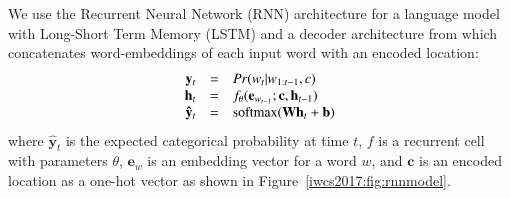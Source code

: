 We use the Recurrent Neural Network (RNN) architecture
for a language model \cite{graves2013generating} with Long-Short Term Memory
(LSTM) \cite{hochreiter1997long} and a decoder architecture from
\cite{cho2014learning} which concatenates word-embeddings of each input word with an encoded location:
\begin{equation}
\begin{array}{r c l}
  \mathbf{y}_t &=& Pr(w_t| w_{1:t-1},c)  \\
  \mathbf{h}_t &=& f_{\theta}(\mathbf{e}_{w_{t-1}};\mathbf{c}, \mathbf{h}_{t-1}) \\
  \mathbf{\hat{y}}_t &=& \mathrm{softmax}(\mathbf{W} \mathbf{h}_t+\mathbf{b})
\end{array}
\end{equation}
\noindent where $\mathbf{\hat{y}}_t$ is the expected categorical probability
at time $t$, $f$ is a recurrent cell with parameters $\theta$,
$\mathbf{e}_w$ is an embedding vector for a word $w$, and $\mathbf{c}$ is an
encoded location as a one-hot vector as shown in Figure~\ref{iwcs2017:fig:rnnmodel}.
